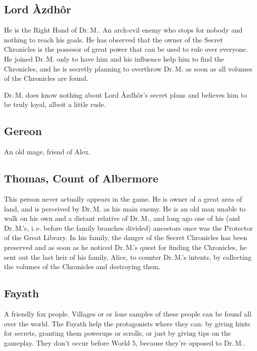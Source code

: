 \documentclass{gd-document}
\newcommand\DrM{Dr.\,M.\xspace}
\newcommand\Azdhor{Lord Àzdhôr\xspace}
\begin{document}
\subsection{\Azdhor}

He is the Right Hand of \DrM. An arch-evil enemy who stops for nobody
and nothing to reach his goals. He has observed that the owner of the
Secret Chronicles is the possesor of great power that can be used to
rule over everyone. He joined \DrM only to have him and his influence
help him to find the Chronicles, and he is secretly planning to
overthrow \DrM as soon as all volumes of the Chronicles are found.

\DrM does know nothing about \Azdhor’s secret plans and believes him
to be truly loyal, albeit a little rude.

\subsection{Gereon}

An old mage, friend of Alex.

\subsection{Thomas, Count of Albermore}\label{sec:thomas}

This person never actually appears in the game. He is owner of a great
area of land, and is perceived by \DrM as his main enemy. He is an old
man unable to walk on his own and a distant relative of \DrM, and long
ago one of his (and \DrM{}’s, i.\,e. before the family branches divided)
ancestors once was the Protector of the Great Library. In his family,
the danger of the Secret Chronicles has been preserved and as soon as
he noticed \DrM{}’s quest for finding the Chronicles, he sent out the
last heir of his family, Alice, to counter \DrM{}’s intents, by
collecting the volumes of the Chronicles and destroying them.

\subsection{Fayath}

A friendly fox people. Villages or or lone samples of these people can
be found all over the world. The Fayath help the protagonists where
they can: by giving hints for secrets, granting them powerups or
scrolls, or just by giving tips on the gameplay. They don’t occur
before World 5, because they’re opposed to \DrM.
\end{document}

